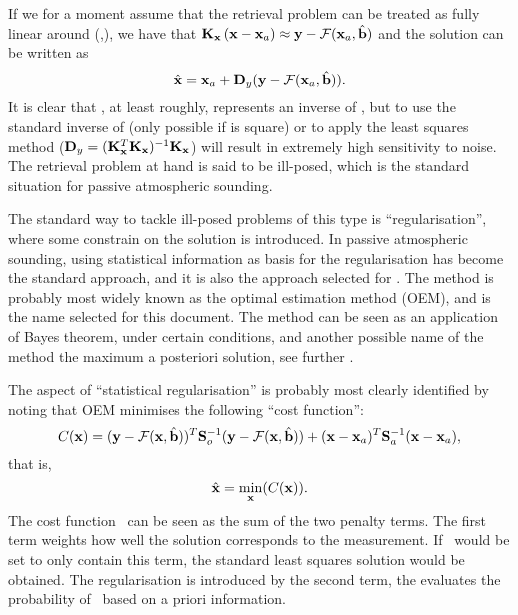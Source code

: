If we for a moment assume that the retrieval problem can be treated as fully
linear around (,\FrwMdlVctHat), we
have that $\mathbf{K}_{\mathbf{x}}\left(\mathbf{x}-\mathbf{x}_{a}\right)\approx \mathbf{y}
-\mathcal{F}(\mathbf{x}_{a},\hat{\mathbf{b}})$ and the solution can be written as
\begin{equation}
  \label{eq:linretrieval}
  \hat{\mathbf{x}} = \mathbf{x}_{a} + \mathbf{D}_{y}(\mathbf{y}-\mathcal{F}(\mathbf{x}_{a},\hat{\mathbf{b}})).
\end{equation}
It is clear that \CtrFncMtr, at least roughly, represents an inverse of
\aWfnMtr{\SttVct}, but to use the standard inverse of \aWfnMtr{\SttVct} (only
possible if \aWfnMtr{\SttVct} is square) or to apply the least squares method
($\mathbf{D}_{y}=(\mathbf{K}_{\mathbf{x}}^T\mathbf{K}_{\mathbf{x}})^{-1}\mathbf{K}_{\mathbf{x}}$)
will result in extremely high sensitivity to noise. The retrieval problem at
hand is said to be ill-posed, which is the standard situation for passive
atmospheric sounding.

The standard way to tackle ill-posed problems of this type is
``regularisation'', where some constrain on the solution is introduced. In
passive atmospheric sounding, using statistical information as basis for the
regularisation has become the standard approach, and it is also the approach
selected for \smr. The method is probably most widely known as the optimal
estimation method (OEM), and is the name selected for this document. The method
can be seen as an application of Bayes theorem, under certain conditions, and
another possible name of the method the maximum a posteriori solution, see
further \citet{rodgers:00}.

The aspect of ``statistical regularisation'' is probably most clearly
identified by noting that OEM minimises the following ``cost function'':
\begin{equation}
  \label{eq:costfun}
  C(\mathbf{x}) = (\mathbf{y}-\mathcal{F}(\mathbf{x},\hat{\mathbf{b}}))^T\mathbf{S}_{o}^{-1}
  (\mathbf{y}-\mathcal{F}(\mathbf{x},\hat{\mathbf{b}})) +
  (\mathbf{x}-\mathbf{x}_{a})^T\mathbf{S}_{a}^{-1}(\mathbf{x}-\mathbf{x}_{a}),
\end{equation}
that is,
\begin{equation}
  \hat{\mathbf{x}} = \min\limits_{\mathbf{x}}(C(\mathbf{x})).
\end{equation}
The cost function \CstFnc\ can be seen as the sum of the two penalty terms. The
first term weights how well the solution corresponds to the measurement. If
\CstFnc\ would be set to only contain this term, the standard least squares
solution would be obtained. The regularisation is introduced by the second
term, the evaluates the probability of \SttVct\ based on a priori
information.

